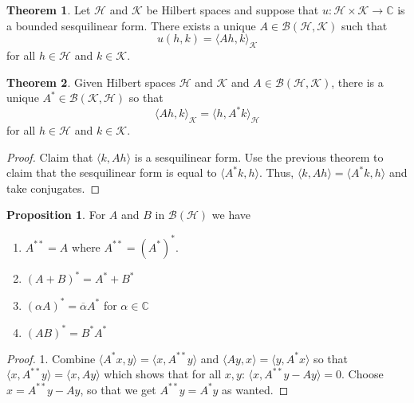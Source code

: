 \documentclass{article}
\theoremstyle{definition}
\newtheorem{theorem}{Theorem}
\newtheorem{proposition}{Proposition}
\begin{document}
    \begin{theorem}
        Let $\mathcal{H}$ and $\mathcal{K}$ be Hilbert spaces and suppose that $u:\mathcal{H}\times\mathcal{K}\to\mathbb{C}$
        is a bounded sesquilinear form. There exists a unique $A\in\mathcal{B}(\mathcal{H},\mathcal{K})$ such that
        \[ u(h,k) = \langle Ah,k\rangle_{\mathcal{K}} \]
        for all $h\in\mathcal{H}$ and $k\in\mathcal{K}$.
    \end{theorem}

    \begin{theorem}
        Given Hilbert spaces $\mathcal{H}$ and $\mathcal{K}$ and $A\in\mathcal{B}(\mathcal{H},\mathcal{K})$, there is a unique
        $A^*\in\mathcal{B}(\mathcal{K},\mathcal{H})$ so that
        \[ \langle Ah,k\rangle_{\mathcal{K}} = \langle h,A^* k\rangle_{\mathcal{H}} \]
        for all $h\in\mathcal{H}$ and $k\in\mathcal{K}$.
    \end{theorem}
    \begin{proof}
        Claim that $\langle k, Ah\rangle$ is a sesquilinear form. Use the previous theorem to claim that the sesquilinear form
        is equal to $\langle A^*k,h\rangle$. Thus, $\langle k,Ah\rangle = \langle A^*k,h\rangle$ and take conjugates.
    \end{proof}

    \begin{proposition}
        For $A$ and $B$ in $\mathcal{B}(\mathcal{H})$ we have
        \begin{enumerate}
            \item $A^{**} = A$ where $A^{**} = (A^*)^*$.
            \item $(A+B)^* = A^* + B^*$
            \item $(\alpha A)^* = \overline{\alpha}A^*$ for $\alpha\in\mathbb{C}$
            \item $(AB)^* = B^* A^*$
        \end{enumerate}
    \end{proposition}
    \begin{proof}
        1. Combine $\langle A^*x,y\rangle = \langle x,A^{**}y\rangle$ and $\langle Ay,x\rangle = \langle y,A^*x\rangle$ so that
        $\langle x,A^{**}y\rangle = \langle x,Ay\rangle$ which shows that for all $x,y$: $\langle x,A^{**}y-Ay\rangle = 0$.
        Choose $x = A^{**}y-Ay$, so that we get $A^{**}y = A^*y$ as wanted.
    \end{proof}
\end{document}
